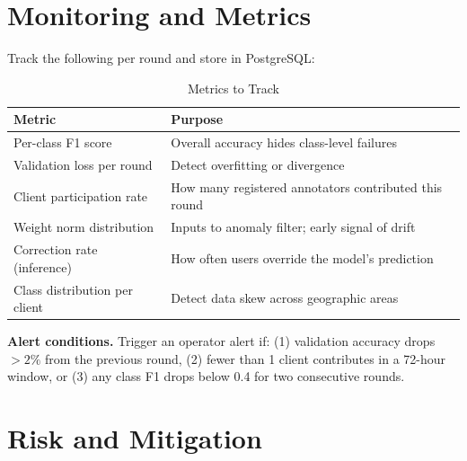 \documentclass[11pt,a4paper]{article}
\begin{document}
\section{Monitoring and Metrics}

Track the following per round and store in PostgreSQL:

\begin{table}[h]
\centering
\caption{Metrics to Track}
\begin{tabular}{@{}p{4cm}p{8cm}@{}}
\toprule
\textbf{Metric} & \textbf{Purpose} \\
\midrule
Per-class F1 score & Overall accuracy hides class-level failures \\
Validation loss per round & Detect overfitting or divergence \\
Client participation rate & How many registered annotators contributed this round \\
Weight norm distribution & Inputs to anomaly filter; early signal of drift \\
Correction rate (inference) & How often users override the model's prediction \\
Class distribution per client & Detect data skew across geographic areas \\
\bottomrule
\end{tabular}
\end{table}

\textbf{Alert conditions.}
Trigger an operator alert if: (1) validation accuracy drops $> 2\%$ from the
previous round, (2) fewer than 1 client contributes in a 72-hour window, or
(3) any class F1 drops below 0.4 for two consecutive rounds.

\section{Risk and Mitigation}
\end{document}

